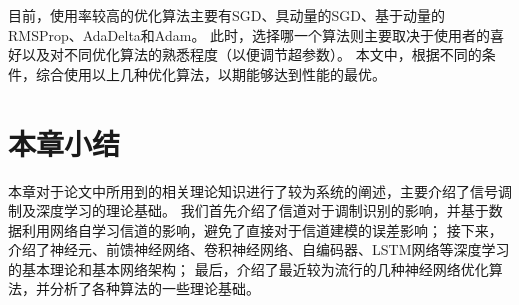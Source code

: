目前，使用率较高的优化算法主要有SGD、具动量的SGD、基于动量的RMSProp、AdaDelta和Adam。
此时，选择哪一个算法则主要取决于使用者的喜好以及对不同优化算法的熟悉程度（以便调节超参数）。
本文中，根据不同的条件，综合使用以上几种优化算法，以期能够达到性能的最优。

\section{本章小结}
本章对于论文中所用到的相关理论知识进行了较为系统的阐述，主要介绍了信号调制及深度学习的理论基础。
我们首先介绍了信道对于调制识别的影响，并基于数据利用网络自学习信道的影响，避免了直接对于信道建模的误差影响；
接下来，介绍了神经元、前馈神经网络、卷积神经网络、自编码器、LSTM网络等深度学习的基本理论和基本网络架构；
最后，介绍了最近较为流行的几种神经网络优化算法，并分析了各种算法的一些理论基础。
